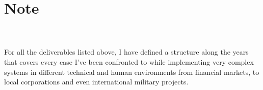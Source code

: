 \documentclass[letterpaper]{twentysecondcv} %
\begin{document}
\section{Note}
\\
\\
\footnotesize{For all the deliverables listed above, I have defined a structure along the years that covers every case I've been confronted to while implementing very complex systems in different technical and human environments from financial markets, to local corporations and even international military projects.}







\end{document}
